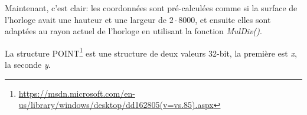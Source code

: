 Maintenant, c'est clair: les coordonnées sont pré-calculées comme si la surface de
l'horloge avait une hauteur et une largeur de $2 \cdot 8000$, et ensuite elles sont
adaptées au rayon actuel de l'horloge en utilisant la fonction \emph{MulDiv()}.

La structure POINT\footnote{\url{https://msdn.microsoft.com/en-us/library/windows/desktop/dd162805(v=vs.85).aspx}}
est une structure de deux valeurs 32-bit, la première est \emph{x}, la seconde \emph{y}.

